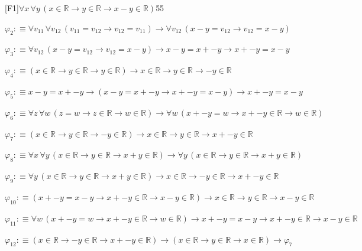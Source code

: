 \begin{fullproof}{[F1]}{$\forall x\,\forall y\,(x \in \mathbb{R} \to y \in \mathbb{R} \to x - y \in \mathbb{R})$}{55}
\begin{abbrevlist}
\item $\varphi_{2} :\equiv \forall v_{11}\,\forall v_{12}\,(v_{11} = v_{12} \to v_{12} = v_{11}) \to \forall v_{12}\,(x - y = v_{12} \to v_{12} = x - y)$
\item $\varphi_{3} :\equiv \forall v_{12}\,(x - y = v_{12} \to v_{12} = x - y) \to x - y = x + -y \to x + -y = x - y$
\item $\varphi_{4} :\equiv (x \in \mathbb{R} \to y \in \mathbb{R} \to y \in \mathbb{R}) \to x \in \mathbb{R} \to y \in \mathbb{R} \to -y \in \mathbb{R}$
\item $\varphi_{5} :\equiv x - y = x + -y \to (x - y = x + -y \to x + -y = x - y) \to x + -y = x - y$
\item $\varphi_{6} :\equiv \forall z\,\forall w\,(z = w \to z \in \mathbb{R} \to w \in \mathbb{R}) \to \forall w\,(x + -y = w \to x + -y \in \mathbb{R} \to w \in \mathbb{R})$
\item $\varphi_{7} :\equiv (x \in \mathbb{R} \to y \in \mathbb{R} \to -y \in \mathbb{R}) \to x \in \mathbb{R} \to y \in \mathbb{R} \to x + -y \in \mathbb{R}$
\item $\varphi_{8} :\equiv \forall x\,\forall y\,(x \in \mathbb{R} \to y \in \mathbb{R} \to x + y \in \mathbb{R}) \to \forall y\,(x \in \mathbb{R} \to y \in \mathbb{R} \to x + y \in \mathbb{R})$
\item $\varphi_{9} :\equiv \forall y\,(x \in \mathbb{R} \to y \in \mathbb{R} \to x + y \in \mathbb{R}) \to x \in \mathbb{R} \to -y \in \mathbb{R} \to x + -y \in \mathbb{R}$
\item $\varphi_{10} :\equiv (x + -y = x - y \to x + -y \in \mathbb{R} \to x - y \in \mathbb{R}) \to x \in \mathbb{R} \to y \in \mathbb{R} \to x - y \in \mathbb{R}$
\item $\varphi_{11} :\equiv \forall w\,(x + -y = w \to x + -y \in \mathbb{R} \to w \in \mathbb{R}) \to x + -y = x - y \to x + -y \in \mathbb{R} \to x - y \in \mathbb{R}$
\item $\varphi_{12} :\equiv (x \in \mathbb{R} \to -y \in \mathbb{R} \to x + -y \in \mathbb{R}) \to (x \in \mathbb{R} \to y \in \mathbb{R} \to x \in \mathbb{R}) \to \varphi_{7}$
\end{abbrevlist}
\end{fullproof}
